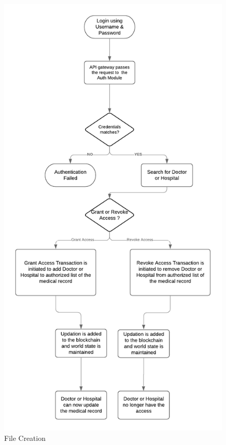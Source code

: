 \documentclass[11pt]{report}
\begin{document}
    
    \begin{figure}[h!]
        \centering
        \includegraphics[scale=0.8]{F2.png}
        \caption{File Creation}
        \label{fig:my_label}
    \end{figure}
    
\end{document}
